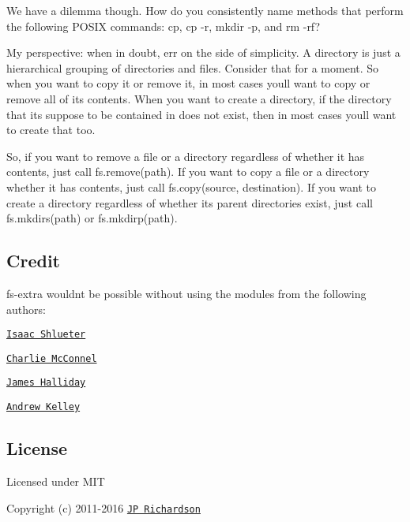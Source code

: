 We have a dilemma though. How do you consistently name methods that perform the following P\+O\+S\+IX commands\+: {\ttfamily cp}, {\ttfamily cp -\/r}, {\ttfamily mkdir -\/p}, and {\ttfamily rm -\/rf}?

My perspective\+: when in doubt, err on the side of simplicity. A directory is just a hierarchical grouping of directories and files. Consider that for a moment. So when you want to copy it or remove it, in most cases you\textquotesingle{}ll want to copy or remove all of its contents. When you want to create a directory, if the directory that it\textquotesingle{}s suppose to be contained in does not exist, then in most cases you\textquotesingle{}ll want to create that too.

So, if you want to remove a file or a directory regardless of whether it has contents, just call {\ttfamily fs.\+remove(path)}. If you want to copy a file or a directory whether it has contents, just call {\ttfamily fs.\+copy(source, destination)}. If you want to create a directory regardless of whether its parent directories exist, just call {\ttfamily fs.\+mkdirs(path)} or {\ttfamily fs.\+mkdirp(path)}.

\subsection*{Credit }

{\ttfamily fs-\/extra} wouldn\textquotesingle{}t be possible without using the modules from the following authors\+:


\begin{DoxyItemize}
\item \href{https://github.com/isaacs}{\tt Isaac Shlueter}
\item \href{https://github.com/avianflu}{\tt Charlie Mc\+Connel}
\item \href{https://github.com/substack}{\tt James Halliday}
\item \href{https://github.com/andrewrk}{\tt Andrew Kelley}
\end{DoxyItemize}

\subsection*{License }

Licensed under M\+IT

Copyright (c) 2011-\/2016 \href{https://github.com/jprichardson}{\tt JP Richardson} 